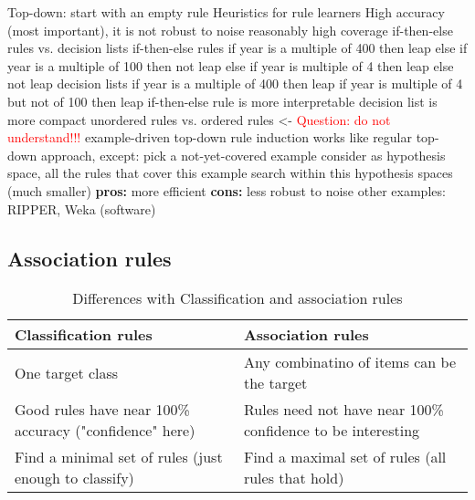 \begin{outline}
    \1 Top-down: start with an empty rule
    \1 Heuristics for rule learners
        \2 High accuracy (most important), it is not robust to noise
        \2 reasonably high coverage
    \1 if-then-else rules vs. decision lists
        \2 if-then-else rules
            \3 if year is a multiple of 400 then leap
            \3 else if year is a multiple of 100 then not leap
            \3 else if year is multiple of 4 then leap
            \3 else not leap
        \2 decision lists
            \3 if year is a multiple of 400 then leap
            \3 if year is multiple of 4 but not of 100 then leap
        \2 if-then-else rule is more interpretable
        \2 decision list is more compact
        \2 unordered rules vs. ordered rules <- \textcolor{red}{Question: do not understand!!!}
    \1 example-driven top-down rule induction
        \2 works like regular top-down approach, except:
            \3 pick a not-yet-covered example
            \3 consider as hypothesis space, all the rules that cover this example
            \3 search within this hypothesis spaces (much smaller)
        \2 \textbf{pros:} more efficient
        \2 \textbf{cons:} less robust to noise
    \1 other examples: RIPPER, Weka (software)
\end{outline}

\subsection{Association rules}
\begin{table}[htbp]\footnotesize
    \centering
    \caption{Differences with Classification and association rules}
    \begin{tabularx}{\textwidth}{X|X}
    \toprule
    \textbf{Classification rules}&\textbf{Association rules} \\
    \hline
    One target class&Any combinatino of items can be the target \\
    \hline
    Good rules have near 100\% accuracy ("confidence" here)&Rules need not have near 100\% confidence to be interesting \\
    \hline
    Find a minimal set of rules (just enough to classify)&Find a maximal set of rules (all rules that hold) \\
    \bottomrule
    \end{tabularx}
    \label{tab:diff_classification_association_rules}
\end{table}

